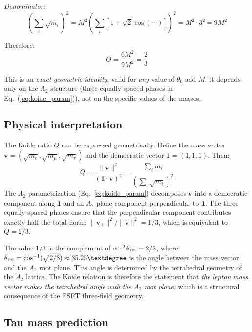 ﻿\documentclass[twocolumn,preprintnumbers,amsmath,amssymb]{revtex4-2}
\begin{document}
\textit{Denominator:}
\begin{equation}
\left(\sum_i \sqrt{m_i}\right)^2 = M^2\left(\sum_i\left[1 + \sqrt{2}\cos(\cdots)\right]\right)^2 = M^2 \cdot 3^2 = 9M^2
\label{eq:denominator}
\end{equation}

Therefore:
\begin{equation}
\boxed{Q = \frac{6M^2}{9M^2} = \frac{2}{3}}
\label{eq:koide_proof}
\end{equation}

This is an \emph{exact geometric identity}, valid for \emph{any} value of $\theta_0$ and $M$. It depends only on the $A_2$ structure (three equally-spaced phases in Eq.~(\ref{eq:koide_param})), not on the specific values of the masses.

\subsection{Physical interpretation}

The Koide ratio $Q$ can be expressed geometrically. Define the mass vector $\mathbf{v} = (\sqrt{m_e}, \sqrt{m_\mu}, \sqrt{m_\tau})$ and the democratic vector $\mathbf{1} = (1,1,1)$. Then:
\begin{equation}
Q = \frac{\|\mathbf{v}\|^2}{(\mathbf{1}\cdot\mathbf{v})^2} = \frac{\sum_i m_i}{(\sum_i\sqrt{m_i})^2}
\end{equation}
The $A_2$ parametrization (Eq.~\ref{eq:koide_param}) decomposes $\mathbf{v}$ into a democratic component along $\mathbf{1}$ and an $A_2$-plane component perpendicular to $\mathbf{1}$. The three equally-spaced phases ensure that the perpendicular component contributes exactly half the total norm: $\|\mathbf{v}_\perp\|^2 / \|\mathbf{v}\|^2 = 1/3$, which is equivalent to $Q = 2/3$.

The value $1/3$ is the complement of $\cos^2\theta_{\rm tet} = 2/3$, where $\theta_{\rm tet} = \cos^{-1}(\sqrt{2/3}) \approx 35.26°$ is the angle between the mass vector and the $A_2$ root plane. This angle is determined by the tetrahedral geometry of the $A_2$ lattice. The Koide relation is therefore the statement that \emph{the lepton mass vector makes the tetrahedral angle with the $A_2$ root plane}, which is a structural consequence of the ESFT three-field geometry.

\subsection{Tau mass prediction}
\end{document}
